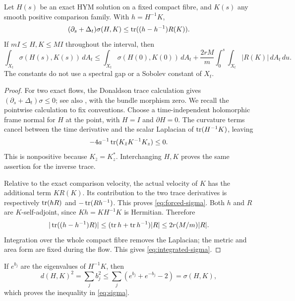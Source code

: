 \begin{lemma}\label{lem:comparison}
Let $H(s)$ be an exact HYM solution on a fixed compact fibre, and
$K(s)$ any smooth positive comparison family. With $h=H^{-1}K$,
\begin{equation}\label{eq:forced-sigma}
 (\partial_s+\Delta_t)\sigma(H,K)
 \le\operatorname{tr}((h-h^{-1})R(K)).
\end{equation}
If $mI\le H,K\le MI$ throughout the interval, then
\begin{equation}\label{eq:integrated-sigma}
 \int_{X_t}\sigma(H(s),K(s))\,dA_t
 \le\int_{X_t}\sigma(H(0),K(0))\,dA_t
 +\frac{2rM}{m}\int_0^s\!\int_{X_t}|R(K)|\,dA_t\,du.
\end{equation}
The constants do not use a spectral gap or a Sobolev constant of $X_t$.
\end{lemma}
\begin{proof}
For two exact flows, the Donaldson trace calculation gives
$(\partial_s+\Delta_t)\sigma\le0$; see also
\cite[Definition~2.3 and Proposition~2.4]{wang}, with the bundle
morphism zero. We recall the pointwise calculation to fix conventions.
Choose a time-independent holomorphic frame normal for $H$ at the
point, with $H=I$ and $\partial H=0$. The curvature terms cancel
between the time derivative and the scalar Laplacian of
$\operatorname{tr}(H^{-1}K)$, leaving
\[
 -4a^{-1}\operatorname{tr}(K_{\bar z}K^{-1}K_z)\le0.
\]
This is nonpositive because $K_{\bar z}=K_z^*$. Interchanging
$H,K$ proves the same assertion for the inverse trace.

Relative to the exact comparison velocity, the actual velocity of
$K$ has the additional term $KR(K)$. Its contribution to the two
trace derivatives is respectively $\operatorname{tr}(hR)$ and $-\operatorname{tr}(Rh^{-1})$.
This proves \eqref{eq:forced-sigma}. Both $h$ and $R$ are
$K$-self-adjoint, since $Kh=KH^{-1}K$ is Hermitian. Therefore
\[
 |\operatorname{tr}((h-h^{-1})R)|
 \le(\operatorname{tr} h+\operatorname{tr} h^{-1})|R|
 \le 2r(M/m)|R|.
\]
Integration over the whole compact fibre removes the Laplacian;
the metric and area form are fixed during the flow. This gives
\eqref{eq:integrated-sigma}.
\end{proof}

If $e^{b_j}$ are the eigenvalues of $H^{-1}K$, then
\[
 d(H,K)^2=\sum_j b_j^2
 \le\sum_j(e^{b_j}+e^{-b_j}-2)=\sigma(H,K),
\]
which proves the inequality in \eqref{eq:sigma}.

